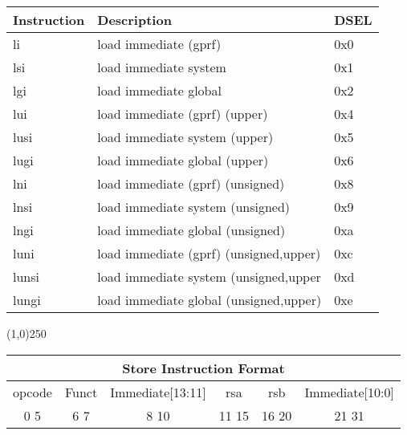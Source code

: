 \documentclass[letterpaper, 11pt]{article}
\begin{document}
	\begin{center}
		\begin{tabular}{|l|l|l|} \hline
			Instruction & Description 								& DSEL\\ \hline
			li			& load immediate (gprf)						& 0x0 \\ \hline
			lsi			& load immediate system						& 0x1 \\ \hline
			lgi			& load immediate global						& 0x2 \\ \hline
			lui			& load immediate (gprf)	(upper)				& 0x4 \\ \hline
			lusi		& load immediate system	(upper)				& 0x5 \\ \hline
			lugi		& load immediate global	(upper)				& 0x6 \\ \hline
			lni			& load immediate (gprf)	(unsigned)			& 0x8 \\ \hline
			lnsi		& load immediate system	(unsigned)			& 0x9 \\ \hline
			lngi		& load immediate global	(unsigned)			& 0xa \\ \hline 
			luni		& load immediate (gprf) (unsigned,upper)	& 0xc \\ \hline
			lunsi		& load immediate system	(unsigned,upper		& 0xd \\ \hline
			lungi		& load immediate global	(unsigned,upper)	& 0xe \\ \hline

		\end{tabular}
	\end{center}

\begin{center}
	\line(1,0){250}
\end{center}


\begin{center}
		\begin{tabular}{|c|c|c|c|c|c|}
			\multicolumn{6}{c}{Store Instruction Format}\\ \hline
				\hspace{2pt} opcode \hspace{2pt} & \hspace{5pt} Funct \hspace{5pt} &  \hspace{4pt} Immediate[13:11] \hspace{4pt} & \hspace{4pt}rsa  \hspace{4pt} & \hspace{4pt}rsb  \hspace{4pt} &\hspace{10pt}Immediate[10:0]  \hspace{10pt}     \\	\hline
				0 \hfill 5&6 \hfill 7&8 \hfill 10&11 \hfill  15&16 \hfill 20&21 \hfill  31\\ \hline
		
	\end{tabular}
\end{center}
\end{document}
